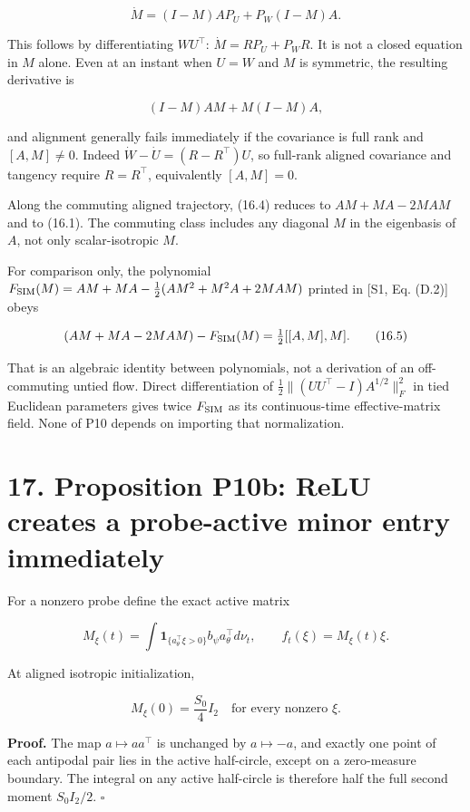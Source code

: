 \documentclass[
  10pt,
]{article}
\begin{document}
\[
 \boxed{\dot M=(I-M)AP_U+P_W(I-M)A.}
 \tag{16.4}
\]

This follows by differentiating \(WU^\top\): \(\dot M=RP_U+P_WR\). It is
not a closed equation in \(M\) alone. Even at an instant when \(U=W\)
and \(M\) is symmetric, the resulting derivative is

\[
 (I-M)AM+M(I-M)A,
\]

and alignment generally fails immediately if the covariance is full rank
and \([A,M]\ne0\). Indeed \(\dot W-\dot U=(R-R^\top)U\), so full-rank
aligned covariance and tangency require \(R=R^\top\), equivalently
\([A,M]=0\).

Along the commuting aligned trajectory, (16.4) reduces to \(AM+MA-2MAM\)
and to (16.1). The commuting class includes any diagonal \(M\) in the
eigenbasis of \(A\), not only scalar-isotropic \(M\).

For comparison only, the polynomial
\(F_{\rm SIM}(M)=AM+MA-\frac12(AM^2+M^2A+2MAM)\) printed in {[}S1, Eq.
(D.2){]} obeys

\[
 (AM+MA-2MAM)-F_{\rm SIM}(M)=\tfrac12[[A,M],M].
 \tag{16.5}
\]

That is an algebraic identity between polynomials, not a derivation of
an off-commuting untied flow. Direct differentiation of
\(\frac12\|(UU^\top-I)A^{1/2}\|_F^2\) in tied Euclidean parameters gives
twice \(F_{\rm SIM}\) as its continuous-time effective-matrix field.
None of P10 depends on importing that normalization.

\section{17. Proposition P10b: ReLU creates a probe-active minor entry
immediately}\label{proposition-p10b-relu-creates-a-probe-active-minor-entry-immediately}

For a nonzero probe define the exact active matrix

\[
 M_\xi(t)=\int\mathbf1_{\{a_\theta^\top\xi>0\}}b_\psi a_\theta^\top d\nu_t,
 \qquad f_t(\xi)=M_\xi(t)\xi.
 \tag{17.1}
\]

At aligned isotropic initialization,

\[
 M_\xi(0)=\frac{S_0}{4}I_2\quad\text{for every nonzero }\xi.
 \tag{17.2}
\]

\textbf{Proof.} The map \(a\mapsto aa^\top\) is unchanged by
\(a\mapsto-a\), and exactly one point of each antipodal pair lies in the
active half-circle, except on a zero-measure boundary. The integral on
any active half-circle is therefore half the full second moment
\(S_0I_2/2\). \(\square\)
\end{document}
